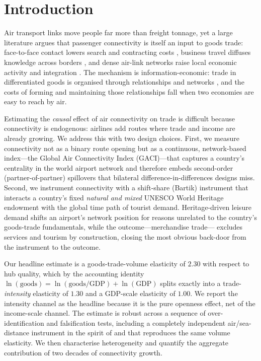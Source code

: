 \documentclass[review,3p,times]{elsarticle}
\begin{document}
\linenumbers

\section{Introduction}
Air transport links move people far more than freight tonnage, yet a large
literature argues that passenger connectivity is itself an input to goods
trade: face-to-face contact lowers search and contracting costs
\citep{Cristea_2011,Belenkiy_2012,Startz_2016}, business travel diffuses
knowledge across borders \citep{Hovhannisyan_2015}, and dense air-link
networks raise local economic activity and integration
\citep{Brueckner_2003,Campante_2017}. The mechanism is information-economic:
trade in differentiated goods is organised through relationships and networks
\citep{Rauch_1999,Allen_2014}, and the costs of forming and maintaining those
relationships fall when two economies are easy to reach by air.

Estimating the \emph{causal} effect of air connectivity on trade is difficult
because connectivity is endogenous: airlines add routes where trade and income
are already growing. We address this with two design choices. First, we
measure connectivity not as a binary route opening but as a continuous,
network-based index---the Global Air Connectivity Index (GACI)---that captures
a country's centrality in the world airport network and therefore embeds
second-order (partner-of-partner) spillovers that bilateral
difference-in-differences designs miss. Second, we instrument connectivity with
a shift-share (Bartik) instrument \citep{GoldsmithPinkham_2020,Borusyak_2022}
that interacts a country's fixed \emph{natural and mixed} UNESCO World Heritage
endowment with the global time path of tourist demand. Heritage-driven leisure
demand shifts an airport's network position for reasons unrelated to the
country's goods-trade fundamentals, while the outcome---merchandise trade---
excludes services and tourism by construction, closing the most obvious
back-door from the instrument to the outcome.

Our headline estimate is a goods-trade-volume elasticity of $2.30$ with respect
to hub quality, which by the accounting identity
$\ln(\text{goods}) = \ln(\text{goods}/\text{GDP}) + \ln(\text{GDP})$ splits
exactly into a trade-\emph{intensity} elasticity of $1.30$ and a GDP-scale
elasticity of $1.00$. We report the intensity channel as the headline because
it is the pure openness effect, net of the income-scale channel. The estimate
is robust across a sequence of over-identification and falsification tests,
including a completely independent air/sea-distance instrument in the spirit of
\citet{Frankel_1999} and \citet{Feyrer_2019} that reproduces the same volume
elasticity. We then characterise heterogeneity and quantify the aggregate
contribution of two decades of connectivity growth.
\end{document}

